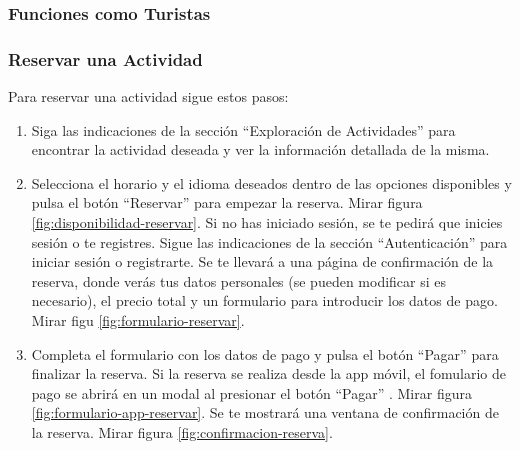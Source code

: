 \newpage
\subsubsection{Funciones como Turistas}
\hrulefill

\subsubsection{Reservar una Actividad}
Para reservar una actividad sigue estos pasos:

\begin{enumerate}
	\item Siga las indicaciones de la sección “Exploración de Actividades” para encontrar la actividad deseada y ver la información detallada de la misma.

	\item Selecciona el horario y el idioma deseados dentro de las opciones disponibles y pulsa el botón “Reservar” para empezar la reserva. Mirar figura \ref{fig:disponibilidad-reservar}.
	      Si no has iniciado sesión, se te pedirá que inicies sesión o te registres. Sigue las indicaciones de la sección “Autenticación” para iniciar sesión o registrarte.
	      Se te llevará a una página de confirmación de la reserva, donde verás tus datos personales (se pueden modificar si es necesario), el precio total y un formulario para introducir los datos de pago. Mirar figu \ref{fig:formulario-reservar}.

	\item Completa el formulario con los datos de pago y pulsa el botón “Pagar” para finalizar la reserva.
	      Si la reserva se realiza desde la app móvil, el fomulario de pago se abrirá en un modal al presionar el botón “Pagar” . Mirar figura \ref{fig:formulario-app-reservar}.
	      Se te mostrará una ventana de confirmación de la reserva. Mirar figura \ref{fig:confirmacion-reserva}.

\end{enumerate}

